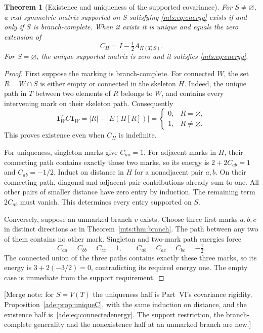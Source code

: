 \documentclass[11pt]{article}
\numberwithin{equation}{section}
\newtheorem{theorem}{Theorem}[section]
\theoremstyle{definition}
\newcommand{\one}{\mathbf 1}
\begin{document}
\begin{theorem}[Existence and uniqueness of the supported covariance]\label{mts:thm:covariance}
For $S\ne\varnothing$, a real symmetric matrix supported on $S$ satisfying
\eqref{mts:eq:energy} exists if and only if $S$ is branch-complete. When it
exists it is unique and equals the zero extension of
\begin{equation}
 C_H=I-\tfrac12 A_{H(T,S)}.
 \label{mts:eq:C}
\end{equation}
For $S=\varnothing$, the unique supported matrix is zero and it satisfies
\eqref{mts:eq:energy}.
\end{theorem}
\begin{proof}
First suppose the marking is branch-complete. For connected $W$, the set
$R=W\cap S$ is either empty or connected in the skeleton $H$. Indeed, the
unique path in $T$ between two elements of $R$ belongs to $W$, and contains
every intervening mark on their skeleton path. Consequently
\[
 \one_W^T C\one_W=|R|-|E(H[R])|
 =\begin{cases}0,&R=\varnothing,\\1,&R\ne\varnothing.\end{cases}
\]
This proves existence even when $C_H$ is indefinite.

For uniqueness, singleton marks give $C_{aa}=1$. For adjacent marks in
$H$, their connecting path contains exactly those two marks, so its
energy is $2+2C_{ab}=1$ and $C_{ab}=-1/2$. Induct on distance in $H$ for a
nonadjacent pair $a,b$. On their connecting path, diagonal and adjacent-pair
contributions already sum to one. All other pairs of smaller distance
have zero entry by induction. The remaining term $2C_{ab}$ must vanish.
This determines every entry supported on $S$.

Conversely, suppose an unmarked branch $v$ exists. Choose three first
marks $a,b,c$ in distinct directions as in Theorem~\ref{mts:thm:branch}. The path
between any two of them contains no other mark. Singleton and two-mark
path energies force
\[
 C_{aa}=C_{bb}=C_{cc}=1,\qquad
 C_{ab}=C_{ac}=C_{bc}=-\tfrac12.
\]
The connected union of the three paths contains exactly these three marks,
so its energy is $3+2(-3/2)=0$, contradicting its required energy one.
The empty case is immediate from the support requirement.
\end{proof}

[Merge note: for $S=V(T)$ the uniqueness half is Part~VI's covariance
rigidity, Proposition~\ref{ade:prop:uniqueC}, with the same induction on
distance, and the existence half is~\eqref{ade:eq:connectedenergy}. The
support restriction, the branch-complete generality and the nonexistence
half at an unmarked branch are new.]
\end{document}
